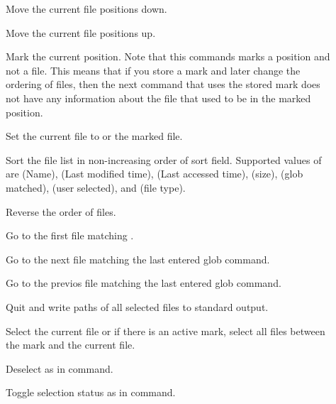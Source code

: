 \begin{description}

\item [] Move the current file  positions
down.

\item [] Move the current file  positions up.

\item [] Mark the current position. Note that this commands
marks a position and not a file. This means that if you store a mark
and later change the ordering of files, then the next command that
uses the stored mark does not have any information about the file that
used to be in the marked position.

\item [] Set the current file to  or the
marked file.

\item [] Sort the file list in non-increasing order
of sort field. Supported values of  are 
(Name),  (Last modified time),  (Last accessed
time),  (size),  (glob matched),  (user
selected), and  (file type).

\item [] Reverse the order of files.

\item [] Go to the first file matching .

\item [] Go to the next file matching the last entered glob
command.

\item [] Go to the previos file matching the last entered glob
command.

\item [] Quit and write paths of all selected files to
standard output.

\item [] Select the current file or if there is an active
mark, select all files between the mark and the current file.

\item [] Deselect as in  command.

\item [] Toggle selection status as in  command.
\end{description}

